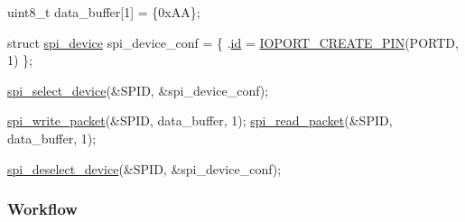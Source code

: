 \begin{DoxyCode}
           uint8\_t data\_buffer[1] = \{0xAA\};

           \textcolor{keyword}{struct }\hyperlink{structspi__device}{spi\_device} spi\_device\_conf = \{
               .\hyperlink{structspi__device_a46fd65e51a4d6c4d6056639a4f154186}{id} = \hyperlink{group__ioport__group_gabc09edad7c3187dec63ce47e6f1b3c51}{IOPORT\_CREATE\_PIN}(PORTD, 1)
           \};

           \hyperlink{group__xmega__spi__master__group_gac8751c855b90ea2774b5007f519e487e}{spi\_select\_device}(&SPID, &spi\_device\_conf);

           \hyperlink{group__xmega__spi__master__group_ga60595beff80eae31c8dad32a8720865a}{spi\_write\_packet}(&SPID, data\_buffer, 1);
           \hyperlink{group__xmega__spi__master__group_ga504ee6688009acff607e0304cc59278d}{spi\_read\_packet}(&SPID, data\_buffer, 1);

           \hyperlink{group__xmega__spi__master__group_gad528d94d606bda0fa6503f77a6a7bb78}{spi\_deselect\_device}(&SPID, &spi\_device\_conf);
\end{DoxyCode}
\hypertarget{spi_master_xmega_spi_master_xmega_basic_usage_flow}{}\subsubsection{Workflow}\label{spi_master_xmega_spi_master_xmega_basic_usage_flow}

